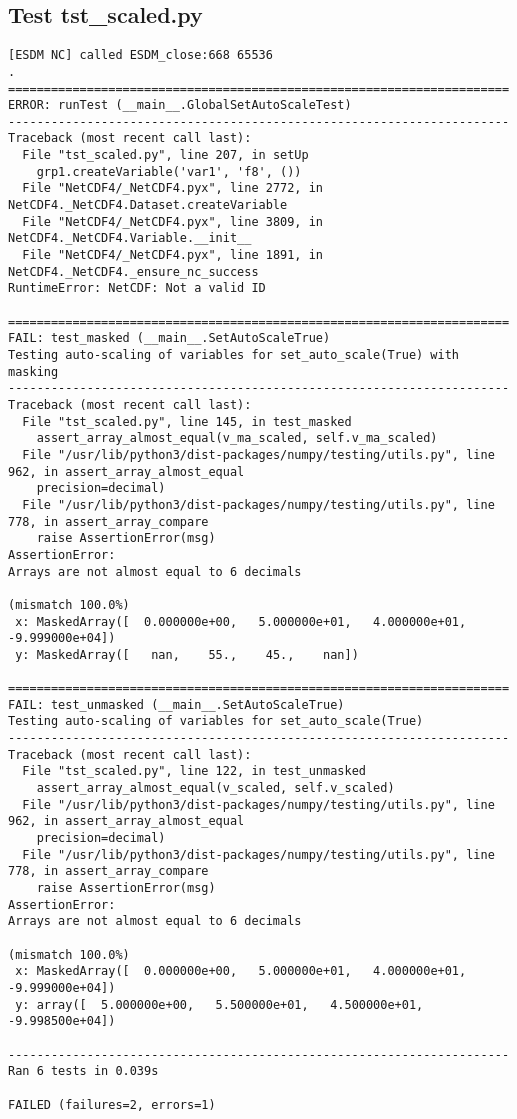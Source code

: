 \subsection{Test tst\_scaled.py}

\begin{verbatim}
[ESDM NC] called ESDM_close:668 65536
.
======================================================================
ERROR: runTest (__main__.GlobalSetAutoScaleTest)
----------------------------------------------------------------------
Traceback (most recent call last):
  File "tst_scaled.py", line 207, in setUp
    grp1.createVariable('var1', 'f8', ())
  File "NetCDF4/_NetCDF4.pyx", line 2772, in NetCDF4._NetCDF4.Dataset.createVariable
  File "NetCDF4/_NetCDF4.pyx", line 3809, in NetCDF4._NetCDF4.Variable.__init__
  File "NetCDF4/_NetCDF4.pyx", line 1891, in NetCDF4._NetCDF4._ensure_nc_success
RuntimeError: NetCDF: Not a valid ID

======================================================================
FAIL: test_masked (__main__.SetAutoScaleTrue)
Testing auto-scaling of variables for set_auto_scale(True) with masking
----------------------------------------------------------------------
Traceback (most recent call last):
  File "tst_scaled.py", line 145, in test_masked
    assert_array_almost_equal(v_ma_scaled, self.v_ma_scaled)
  File "/usr/lib/python3/dist-packages/numpy/testing/utils.py", line 962, in assert_array_almost_equal
    precision=decimal)
  File "/usr/lib/python3/dist-packages/numpy/testing/utils.py", line 778, in assert_array_compare
    raise AssertionError(msg)
AssertionError:
Arrays are not almost equal to 6 decimals

(mismatch 100.0%)
 x: MaskedArray([  0.000000e+00,   5.000000e+01,   4.000000e+01,  -9.999000e+04])
 y: MaskedArray([   nan,    55.,    45.,    nan])

======================================================================
FAIL: test_unmasked (__main__.SetAutoScaleTrue)
Testing auto-scaling of variables for set_auto_scale(True)
----------------------------------------------------------------------
Traceback (most recent call last):
  File "tst_scaled.py", line 122, in test_unmasked
    assert_array_almost_equal(v_scaled, self.v_scaled)
  File "/usr/lib/python3/dist-packages/numpy/testing/utils.py", line 962, in assert_array_almost_equal
    precision=decimal)
  File "/usr/lib/python3/dist-packages/numpy/testing/utils.py", line 778, in assert_array_compare
    raise AssertionError(msg)
AssertionError:
Arrays are not almost equal to 6 decimals

(mismatch 100.0%)
 x: MaskedArray([  0.000000e+00,   5.000000e+01,   4.000000e+01,  -9.999000e+04])
 y: array([  5.000000e+00,   5.500000e+01,   4.500000e+01,  -9.998500e+04])

----------------------------------------------------------------------
Ran 6 tests in 0.039s

FAILED (failures=2, errors=1)
\end{verbatim}


